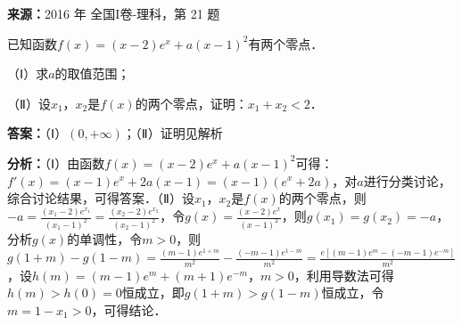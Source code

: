 \begin{question}[points=12]
\textbf{来源：}2016 年 全国I卷-理科，第 21 题\par
已知函数$f(x)=(x-2)e^x+a(x-1)^2$有两个零点．

（Ⅰ）求$a$的取值范围；

（Ⅱ）设$x_1$，$x_2$是$f(x)$的两个零点，证明：$x_1+x_2<2$．
\begin{solution}
\textbf{答案：}（Ⅰ）$(0,+\infty)$；（Ⅱ）证明见解析

\textbf{分析：}（Ⅰ）由函数$f(x)=(x-2)e^x+a(x-1)^2$可得：$f'(x)=(x-1)e^x+2a(x-1)=(x-1)(e^x+2a)$，对$a$进行分类讨论，综合讨论结果，可得答案．（Ⅱ）设$x_1$，$x_2$是$f(x)$的两个零点，则$-a=\frac{(x_1-2)e^{x_1}}{(x_1-1)^2}=\frac{(x_2-2)e^{x_2}}{(x_2-1)^2}$，令$g(x)=\frac{(x-2)e^x}{(x-1)^2}$，则$g(x_1)=g(x_2)=-a$，分析$g(x)$的单调性，令$m>0$，则$g(1+m)-g(1-m)=\frac{(m-1)e^{1+m}}{m^2}-\frac{(-m-1)e^{1-m}}{m^2}=\frac{e[ (m-1)e^m - (-m-1)e^{-m}]}{m^2}$，设$h(m)= (m-1)e^m + (m+1)e^{-m}$，$m>0$，利用导数法可得$h(m)>h(0)=0$恒成立，即$g(1+m)>g(1-m)$恒成立，令$m=1-x_1>0$，可得结论．


\end{solution}
\end{question}
